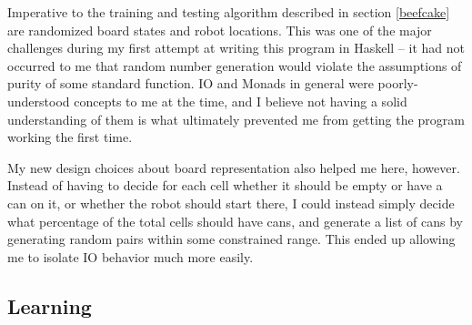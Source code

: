 \documentclass[12pt,a4paper]{article}
\begin{document}
			\par Imperative to the training and testing algorithm described in section \ref{beefcake} are randomized board states and robot locations. This was one of the major challenges during my first attempt at writing this program in Haskell -- it had not occurred to me that random number generation would violate the assumptions of purity of some standard function. IO and Monads in general were poorly-understood concepts to me at the time, and I believe not having a solid understanding of them is what ultimately prevented me from getting the program working the first time.
		\par My new design choices about board representation also helped me here, however. Instead of having to decide for each cell whether it should be empty or have a can on it, or whether the robot should start there, I could instead simply decide what percentage of the total cells should have cans, and generate a list of cans by generating random pairs within some constrained range. This ended up allowing me to isolate IO behavior much more easily.

		\subsection{Learning}
		
\end{document}
